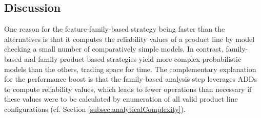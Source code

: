\begin{table}[htb]
\centering
\caption{Probabilistic models statistics.}
\label{table:modelsData}
\end{table}











\subsection{Discussion \label{subsec:discussion}}


One reason for the feature-family-based strategy being faster than the
alternatives is that it computes the reliability values of a product line by
model checking a small number of comparatively simple models. In contrast,
family-based and family-product-based strat\-e\-gies yield more complex
probabilistic models than the others, trading space for time.  The complementary
explanation for the performance boost is that the family-based analysis step
leverages ADDs to compute reliability values, which leads to fewer operations
than necessary if these values were to be calculated by enumeration of all valid
product line configurations (cf. Section \ref{subsec:analyticalComplexity}).

